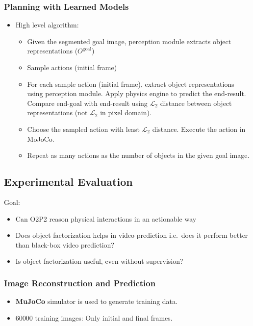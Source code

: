 \documentclass{article}
\begin{document}
    \subsubsection{Planning with Learned Models}\label{subsubsec:Reasoning_about_Physical_Interactions_with_Object_Oriented_Prediction_and_Planning_(O2P2):planning-with-learned-models}
    \begin{itemize}
        \item High level algorithm:
        \begin{itemize}
            \item Given the segmented goal image, perception module extracts object representations ($O^{\textrm{goal}}$)
            \item Sample actions (initial frame)
            \item For each sample action (initial frame), extract object representations using perception module.
            Apply physics engine to predict the end-result.
            Compare end-goal with end-result using $\mathcal{L}_2$ distance between object representations (not $\mathcal{L}_2$ in pixel domain).
            \item Choose the sampled action with least $\mathcal{L}_2$ distance.
            Execute the action in MoJoCo.
            \item Repeat as many actions as the number of objects in the given goal image.
        \end{itemize}
    \end{itemize}

    \subsection{Experimental Evaluation}\label{subsec:Reasoning_about_Physical_Interactions_with_Object_Oriented_Prediction_and_Planning_(O2P2):experimental-evaluation}
    Goal:
    \begin{itemize}
        \item Can O2P2 reason physical interactions in an actionable way
        \item Does object factorization helps in video prediction i.e.\ does it perform better than black-box video prediction?
        \item Is object factorization useful, even without supervision?
    \end{itemize}

    \subsubsection{Image Reconstruction and Prediction}\label{subsubsec:Reasoning_about_Physical_Interactions_with_Object_Oriented_Prediction_and_Planning_(O2P2):image-reconstruction-and-prediction}
    \begin{itemize}
        \item \textbf{MuJoCo} simulator is used to generate training data.
        \item 60000 training images: Only initial and final frames.
    \end{itemize}
\end{document}
